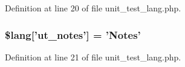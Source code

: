 Definition at line 20 of file unit\-\_\-test\-\_\-lang.\-php.

\subsubsection[{\$lang}]{\setlength{\rightskip}{0pt plus 5cm}\$lang['ut\-\_\-notes'] = 'Notes'}\label{unit__test__lang_8php_a4d80b77ed0c51d05d5abdc88afa1b540}


Definition at line 21 of file unit\-\_\-test\-\_\-lang.\-php.

